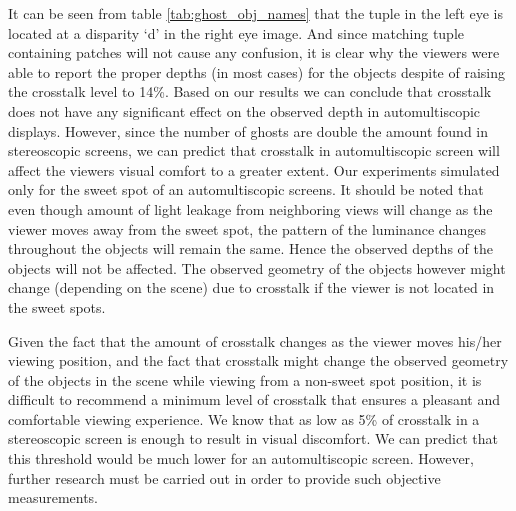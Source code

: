 It can be seen from table \ref{tab:ghost_obj_names} that the tuple in the left eye is located at a disparity `d' in the right eye image. And since matching tuple containing patches will not cause any confusion, it is clear why the viewers were able to report the proper depths (in most cases) for the objects despite of raising the crosstalk level to 14\%. Based on our results we can conclude that crosstalk does not have any significant effect on the observed depth in automultiscopic displays. However, since the number of ghosts are double the amount found in stereoscopic screens, we can predict that crosstalk in automultiscopic screen will affect the viewers visual comfort to a greater extent. Our experiments simulated only for the sweet spot of an automultiscopic screens. It should be noted that even though amount of light leakage from neighboring views will change as the viewer moves away from the sweet spot, the pattern of the luminance changes throughout the objects will remain the same. Hence the observed depths of the objects will not be affected. The observed geometry of the objects however might change (depending on the scene) due to crosstalk if the viewer is not located in the sweet spots.

Given the fact that the amount of crosstalk changes as the viewer moves his/her viewing position, and the fact that crosstalk might change the observed geometry of the objects in the scene while viewing from a non-sweet spot position, it is difficult to recommend a minimum level of crosstalk that ensures a pleasant and comfortable viewing experience. We know that as low as 5\% of crosstalk in a stereoscopic screen is enough to result in visual discomfort. We can predict that this threshold would be much lower for an automultiscopic screen. However, further research must be carried out in order to provide such objective measurements.

